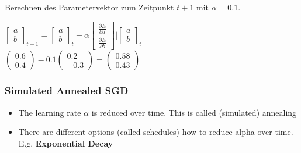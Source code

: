 Berechnen des Parametervektor zum Zeitpunkt $t+1$ mit $\alpha = 0.1$.
\begin{center}
    $ \begin{bmatrix}a \\ b\end{bmatrix}_{t+1} = \begin{bmatrix}a \\ b\end{bmatrix}_{t} - \alpha \begin{bmatrix}\frac{\partial E}{\partial a} \\ \frac{\partial E}{\partial b}\end{bmatrix} \biggr | \begin{bmatrix}a \\ b\end{bmatrix}_{t}$\\
    $ \begin{pmatrix}0.6 \\ 0.4\end{pmatrix} - 0.1 \begin{pmatrix}0.2 \\ -0.3\end{pmatrix} = \begin{pmatrix}0.58 \\ 0.43\end{pmatrix}$
\end{center}


\subsubsection{Simulated Annealed SGD}
\begin{itemize}
    \item The learning rate $\alpha$ is reduced over time. This is called (simulated) annealing
    \item There are different options (called schedules) how to reduce alpha over time. E.g. \textbf{Exponential Decay}
\end{itemize}

